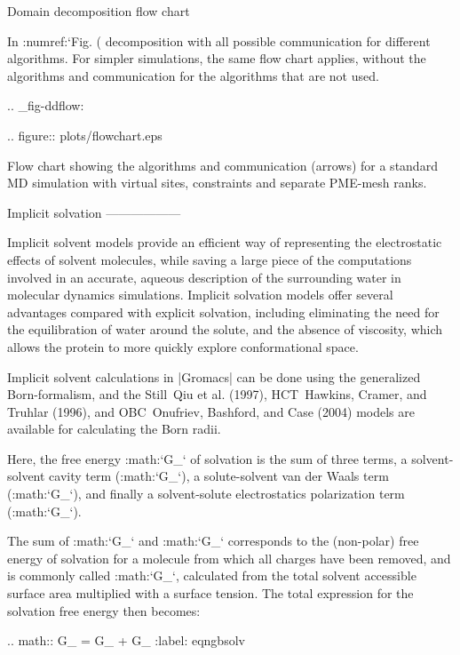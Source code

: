 Domain decomposition flow chart
~~~~~~~~~~~~~~~~~~~~~~~~~~~~~~~

In :numref:`Fig. (%
decomposition with all possible communication for different algorithms.
For simpler simulations, the same flow chart applies, without the
algorithms and communication for the algorithms that are not used.

.. _fig-ddflow:

.. figure:: plots/flowchart.eps

   Flow chart showing the algorithms and communication (arrows)
   for a standard MD simulation with virtual sites, constraints and
   separate PME-mesh ranks.

Implicit solvation
------------------

Implicit solvent models provide an efficient way of representing the
electrostatic effects of solvent molecules, while saving a large piece
of the computations involved in an accurate, aqueous description of the
surrounding water in molecular dynamics simulations. Implicit solvation
models offer several advantages compared with explicit solvation,
including eliminating the need for the equilibration of water around the
solute, and the absence of viscosity, which allows the protein to more
quickly explore conformational space.

Implicit solvent calculations in |Gromacs| can be done using the
generalized Born-formalism, and the Still Qiu et al. (1997),
HCT Hawkins, Cramer, and Truhlar (1996), and OBC Onufriev, Bashford, and
Case (2004) models are available for calculating the Born radii.

Here, the free energy :math:`G_{}` of solvation is the sum
of three terms, a solvent-solvent cavity term
(:math:`G_{}`), a solute-solvent van der Waals term
(:math:`G_{}`), and finally a solvent-solute electrostatics
polarization term (:math:`G_{}`).

The sum of :math:`G_{}` and :math:`G_{}`
corresponds to the (non-polar) free energy of solvation for a molecule
from which all charges have been removed, and is commonly called
:math:`G_{}`, calculated from the total solvent accessible
surface area multiplied with a surface tension. The total expression for
the solvation free energy then becomes:

.. math::  G_{} = G_{}  + G_{}
           :label: eqngbsolv

